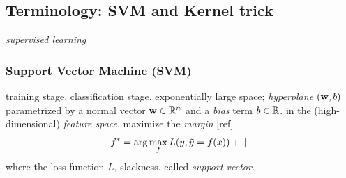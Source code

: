 \subsection{Terminology: SVM and Kernel trick}\label{sec:svm}
\emph{supervised learning} 

\subsubsection{Support Vector Machine (SVM)}
training stage, classification stage.
exponentially large space;
\emph{hyperplane} $(\vb{w},b)$ parametrized by a normal vector $\vb{w}\in\mathbb{R}^n$ and a \emph{bias} term $b\in\mathbb{R}$. in the (high-dimensional) \emph{feature space}.
maximize the \emph{margin} [ref]
\begin{equation}
	f^* = \arg \max_f  L(y,\tilde{y}=f(x)) + \norm{}
\end{equation}
where the loss function $L$, slackness. called \emph{support vector}.

